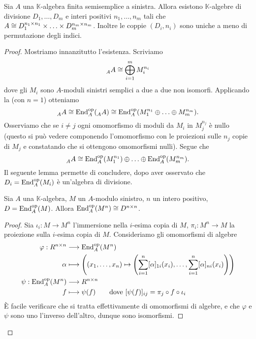 \begin{proposition}
Sia $A$ una $\mathbb{K}$-algebra finita semisemplice a sinistra. Allora esistono $\mathbb{K}$-algebre di divisione $D_1,\ldots,D_m$ e interi positivi $n_1,\ldots, n_m$ tali che $A\cong D_1^{n_1\times n_1}\times\ldots\times D_m^{n_m\times n_m}$. Inoltre le coppie $(D_i,n_i)$ sono uniche a meno di permutazione degli indici.
\end{proposition}
\begin{proof}
Mostriamo innanzitutto l'esistenza. Scriviamo
$$
\prescript{}{A}{A}\cong\bigoplus_{i=1}^{m}M_i^{n_i}
$$
dove gli $M_i$ sono $A$-moduli sinistri semplici a due a due non isomorfi. Applicando la  (con $n=1$) otteniamo
$$
\prescript{}{A}{A}\cong\operatorname{End}^{\operatorname{op}}_A(\prescript{}{A}{A})\cong\operatorname{End}^{\operatorname{op}}_A(M_1^{n_1}\oplus\ldots\oplus M_m^{n_m}).
$$
Osserviamo che se $i\neq j$ ogni omomorfismo di moduli da $M_i$ in $M_j^{n_j}$ è nullo (questo si può vedere componendo l'omomorfismo con le proiezioni sulle $n_j$ copie di $M_j$ e constatando che si ottengono omomorfismi nulli). Segue che
$$
\prescript{}{A}{A}\cong \operatorname{End}^{\operatorname{op}}_A(M_1^{n_1})\oplus\ldots\oplus\operatorname{End}^{\operatorname{op}}_A(M_m^{n_m}).
$$
Il seguente lemma permette di concludere, dopo aver osservato che $D_i=\operatorname{End}^{\operatorname{op}}_A(M_i)$ è un'algebra di divisione.
\begin{lemma*}
Sia $A$ una $\mathbb{K}$-algebra, $M$ un $A$-modulo sinistro, $n$ un intero positivo, $D=\operatorname{End}^{\operatorname{op}}_A(M)$. Allora $\operatorname{End}^{\operatorname{op}}_A(M^n)\cong D^{n\times n}$.
\end{lemma*}
\begin{proof}
Sia $\iota_i:M\to M^n$ l'immersione nella $i$-esima copia di $M$, $\pi_i:M^n\to M$ la proiezione sulla $i$-esima copia di $M$. Consideriamo gli omomorfismi di algebre
\begin{align*}
\varphi: R^{n\times n}&\longrightarrow\operatorname{End}^{\operatorname{op}}_A(M^n)\\
\alpha&\longmapsto\left((x_1,\ldots,x_n)\mapsto\left(\sum_{i=1}^{n}[\alpha]_{1i}(x_i),\ldots,\sum_{i=1}^{n}[\alpha]_{ni}(x_i)\right)\right)\\
\psi:\operatorname{End}^{\operatorname{op}}_A(M^n)&\longrightarrow R^{n\times n}\\
f&\longmapsto\psi(f)\qquad\text{dove $[\psi(f)]_{ij}=\pi_j\circ f\circ\iota_i$}
\end{align*}
È facile verificare che si tratta effettivamente di omomorfismi di algebre, e che $\varphi$ e $\psi$ sono uno l'inverso dell'altro, dunque sono isomorfismi.
\end{proof}

\end{proof}
